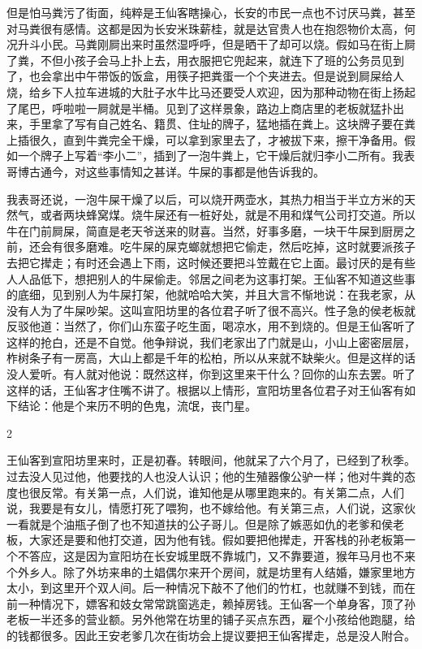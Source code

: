 但是怕马粪污了街面，纯粹是王仙客瞎操心，长安的市民一点也不讨厌马粪，甚至对马粪很有感情。这都是因为长安米珠薪桂，就是达官贵人也在抱怨物价太高，何况升斗小民。马粪刚屙出来时虽然湿呼呼，但是晒干了却可以烧。假如马在街上屙了粪，不但小孩子会马上扑上去，用衣服把它兜起来，就连下了班的公务员见到了，也会拿出中午带饭的饭盒，用筷子把粪蛋一个个夹进去。但是说到屙屎给人烧，给乡下人拉车进城的大肚子水牛比马还要受人欢迎，因为那种动物在街上扬起了尾巴，呼啦啦一屙就是半桶。见到了这样景象，路边上商店里的老板就猛扑出来，手里拿了写有自己姓名、籍贯、住址的牌子，猛地插在粪上。这块牌子要在粪上插很久，直到牛粪完全干燥，可以拿到家里去了，才被拔下来，擦干净备用。假如一个牌子上写着“李小二”，插到了一泡牛粪上，它干燥后就归李小二所有。我表哥博古通今，对这些事情知之甚详。牛屎的事都是他告诉我的。 

我表哥还说，一泡牛屎干燥了以后，可以烧开两壶水，其热力相当于半立方米的天然气，或者两块蜂窝煤。烧牛屎还有一桩好处，就是不用和煤气公司打交道。所以牛在门前屙屎，简直是老天爷送来的财喜。当然，好事多磨，一块干牛屎到厨房之前，还会有很多磨难。吃牛屎的屎克螂就想把它偷走，然后吃掉，这时就要派孩子去把它撵走；有时还会遇上下雨，这时候还要把斗笠戴在它上面。最讨厌的是有些人人品低下，想把别人的牛屎偷走。邻居之间老为这事打架。王仙客不知道这些事的底细，见到别人为牛屎打架，他就哈哈大笑，并且大言不惭地说：在我老家，从没有人为了牛屎吵架。这叫宣阳坊里的各位君子听了很不高兴。性子急的侯老板就反驳他道：当然了，你们山东蛮子吃生面，喝凉水，用不到烧的。但是王仙客听了这样的抢白，还是不自觉。他争辩说，我们老家出了门就是山，小山上密密层层，柞树条子有一房高，大山上都是千年的松柏，所以从来就不缺柴火。但是这样的话没人爱听。有人就对他说：既然这样，你到这里来干什么？回你的山东去罢。听了这样的话，王仙客才住嘴不讲了。根据以上情形，宣阳坊里各位君子对王仙客有如下结论：他是个来历不明的色鬼，流氓，丧门星。 

2 

王仙客到宣阳坊里来时，正是初春。转眼间，他就呆了六个月了，已经到了秋季。过去没人见过他，他要找的人也没人认识；他的生殖器像公驴一样；他对牛粪的态度也很反常。有关第一点，人们说，谁知他是从哪里跑来的。有关第二点，人们说，我要是有女儿，情愿打死了喂狗，也不嫁给他。有关第三点，人们说，这家伙一看就是个油瓶子倒了也不知道扶的公子哥儿。但是除了嫉恶如仇的老爹和侯老板，大家还是要和他打交道，因为他有钱。假如要把他撵走，开客栈的孙老板第一个不答应，这是因为宣阳坊在长安城里既不靠城门，又不靠要道，猴年马月也不来个外乡人。除了外坊来串的土娼偶尔来开个房间，就是坊里有人结婚，嫌家里地方太小，到这里开个双人间。后一种情况下敲不了他们的竹杠，也就赚不到钱，而在前一种情况下，嫖客和妓女常常跳窗逃走，赖掉房钱。王仙客一个单身客，顶了孙老板一半还多的营业额。另外他常在坊里的铺子买点东西，雇个小孩给他跑腿，给的钱都很多。因此王安老爹几次在街坊会上提议要把王仙客撵走，总是没人附合。 

